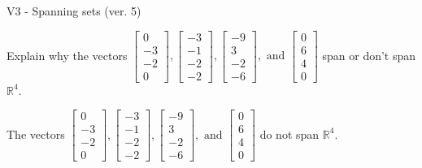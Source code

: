 \begin{exercise}
  \begin{exerciseTitle}V3 - Spanning sets (ver. 5)\end{exerciseTitle}
  \begin{exerciseStatement}
    Explain why the vectors \(\left[\begin{array}{r}
0 \\
-3 \\
-2 \\
0
\end{array}\right] , \left[\begin{array}{r}
-3 \\
-1 \\
-2 \\
-2
\end{array}\right] , \left[\begin{array}{r}
-9 \\
3 \\
-2 \\
-6
\end{array}\right] , \text{ and } \left[\begin{array}{r}
0 \\
6 \\
4 \\
0
\end{array}\right]\) span or don't span \(\mathbb{R}^4\). 
	


  \end{exerciseStatement}
  \begin{exerciseAnswer}
   The vectors \(\left[\begin{array}{r}
0 \\
-3 \\
-2 \\
0
\end{array}\right] , \left[\begin{array}{r}
-3 \\
-1 \\
-2 \\
-2
\end{array}\right] , \left[\begin{array}{r}
-9 \\
3 \\
-2 \\
-6
\end{array}\right] , \text{ and } \left[\begin{array}{r}
0 \\
6 \\
4 \\
0
\end{array}\right]\) 
  	 do not  
	span \(\mathbb{R}^4\).
  


  \end{exerciseAnswer}
\end{exercise}